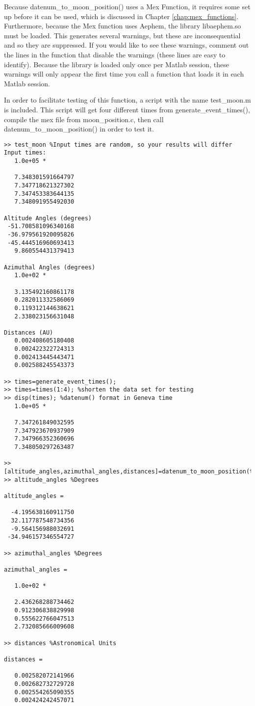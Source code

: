 \documentclass[12pt]{report}
\begin{document}
Because datenum\_to\_moon\_position() uses a Mex Function, it requires some set up before it can be used, which is discussed in Chapter \ref{chap:mex_functions}.  Furthermore, because the Mex function uses Aephem, the library libaephem.so must be loaded.  This generates several warnings, but these are inconsequential and so they are suppressed.  If you would like to see these warnings, comment out the lines in the function that disable the warnings (these lines are easy to identify).  Because the library is loaded only once per Matlab session, these warnings will only appear the first time you call a function that loads it in each Matlab session.

In order to facilitate testing of this function, a script with the name test\_moon.m is included.  This script will get four different times from generate\_event\_times(), compile the mex file from moon\_position.c, then call datenum\_to\_moon\_position() in order to test it.

\begin{verbatim}
>> test_moon %Input times are random, so your results will differ
Input times:
   1.0e+05 *

   7.348301591664797
   7.347718621327302
   7.347453383644135
   7.348091955492030

Altitude Angles (degrees)
 -51.708581096340168
 -36.979561920095826
 -45.444516960693413
   9.860554431379413

Azimuthal Angles (degrees)
   1.0e+02 *

   3.135492160861178
   0.282011332586069
   0.119312144638621
   2.338023156631048

Distances (AU)
   0.002408605180408
   0.002422322724313
   0.002413445443471
   0.002588245543373

>> times=generate_event_times();
>> times=times(1:4); %shorten the data set for testing
>> disp(times); %datenum() format in Geneva time
   1.0e+05 *

   7.347261849032595
   7.347923670937909
   7.347966352360696
   7.348050297263487

>> [altitude_angles,azimuthal_angles,distances]=datenum_to_moon_position(times);
>> altitude_angles %Degrees

altitude_angles =

  -4.195638160911750
  32.117787548734356
  -9.564156988032691
 -34.946157346554727

>> azimuthal_angles %Degrees

azimuthal_angles =

   1.0e+02 *

   2.436268288734462
   0.912306838829998
   0.555622766047513
   2.732085666009608

>> distances %Astronomical Units

distances =

   0.002582072141966
   0.002682732729728
   0.002554265090355
   0.002424242457071
\end{verbatim}
\end{document}
